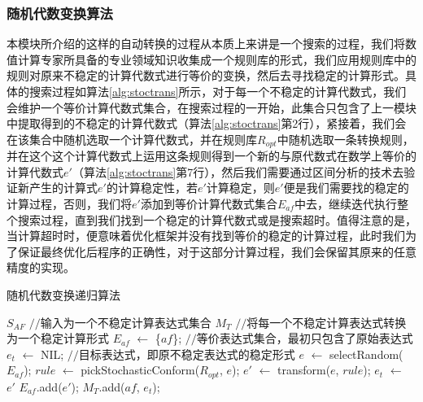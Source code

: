 \subsubsection{随机代数变换算法}

本模块所介绍的这样的自动转换的过程从本质上来讲是一个搜索的过程，我们将数值计算专家所具备的专业领域知识收集成一个规则库的形式，我们应用规则库中的规则对原来不稳定的计算代数式进行等价的变换，然后去寻找稳定的计算形式。具体的搜索过程如算法\ref{alg:stoctrans}所示，对于每一个不稳定的计算代数式，我们会维护一个等价计算代数式集合，在搜索过程的一开始，此集合只包含了上一模块中提取得到的不稳定的计算代数式（算法\ref{alg:stoctrans}第2行），紧接着，我们会在该集合中随机选取一个计算代数式，并在规则库$R_{opt}$中随机选取一条转换规则，并在这个这个计算代数式上运用这条规则得到一个新的与原代数式在数学上等价的计算代数式$e'$（算法\ref{alg:stoctrans}第7行），然后我们需要通过区间分析的技术去验证新产生的计算式$e'$的计算稳定性，若$e'$计算稳定，则$e'$便是我们需要找的稳定的计算过程，否则，我们将$e'$添加到等价计算代数式集合$E_{af}$中去，继续迭代执行整个搜索过程，直到我们找到一个稳定的计算代数式或是搜索超时。值得注意的是，当计算超时时，便意味着优化框架并没有找到等价的稳定的计算过程，此时我们为了保证最终优化后程序的正确性，对于这部分计算过程，我们会保留其原来的任意精度的实现。

\begin{algorithm}[tb]
  \caption{随机代数变换递归算法}
  \label{alg:stoctrans}
\begin{algorithmic}[1]
\REQUIRE $S_{AF}$ \hfill {{\footnotesize$//$}\small 输入为一个不稳定计算表达式集合}
\ENSURE $M_{T}$  {{\footnotesize$//$}\small 将每一个不稳定计算表达式转换为一个稳定计算形式} %
      \STATE $E_{af}$ $\leftarrow$ \{$af$\}; \hfill {{\footnotesize$//$}\small 等价表达式集合，最初只包含了原始表达式} \label{alg:stoctrans:eqset}
      \STATE $e_t$ $\leftarrow$ NIL; \hfill {{\footnotesize$//$}\small 目标表达式，即原不稳定表达式的稳定形式}
      \REPEAT
        \STATE $e$ $\leftarrow$ selectRandom($E_{af}$); \label{alg:stoctrans:expselect}%
        \STATE $rule$ $\leftarrow$ pickStochasticConform($R_{opt}$, $e$); \label{alg:stoctrans:rulepick}
        \STATE $e'$ $\leftarrow$ transform($e$, $rule$); \label{alg:stoctrans:applytrans}
         \label{alg:stoctrans:stableverify}
          \STATE $e_t$ $\leftarrow$ $e'$ \label{alg:stoctrans:getet}
        \ELSE
          \STATE $E_{af}$.add($e'$); \label{alg:stoctrans:putbackep}%
        \ENDIF
      \STATE $M_{T}$.add($af$, $e_t$); \label{alg:stoctrans:resultmap}
    \ENDFOR
\end{algorithmic}
\end{algorithm}

